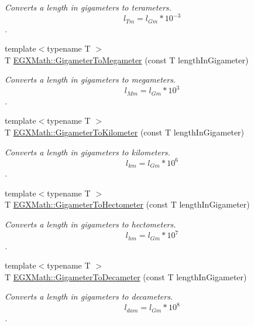 \begin{DoxyCompactItemize}
\begin{DoxyCompactList}\small\item\em Converts a length in gigameters to terameters. \[ l_{Tm}=l_{Gm} * 10^{-3} \]. \end{DoxyCompactList}\item 
{\footnotesize template$<$typename T $>$ }\\T \mbox{\hyperlink{group___e_g_x_math-_conversions-_length_conversions-_s_i-_gigameter-_s_i_ga13984c61b3aaa41953de2415c6981f37}{E\+G\+X\+Math\+::\+Gigameter\+To\+Megameter}} (const T length\+In\+Gigameter)
\begin{DoxyCompactList}\small\item\em Converts a length in gigameters to megameters. \[ l_{Mm}=l_{Gm} * 10^{3} \]. \end{DoxyCompactList}\item 
{\footnotesize template$<$typename T $>$ }\\T \mbox{\hyperlink{group___e_g_x_math-_conversions-_length_conversions-_s_i-_gigameter-_s_i_ga6f5a65da868d2c40485588dff765836e}{E\+G\+X\+Math\+::\+Gigameter\+To\+Kilometer}} (const T length\+In\+Gigameter)
\begin{DoxyCompactList}\small\item\em Converts a length in gigameters to kilometers. \[ l_{km}=l_{Gm} * 10^{6} \]. \end{DoxyCompactList}\item 
{\footnotesize template$<$typename T $>$ }\\T \mbox{\hyperlink{group___e_g_x_math-_conversions-_length_conversions-_s_i-_gigameter-_s_i_ga25121199c511ed43c20fa9c9bdefc0ca}{E\+G\+X\+Math\+::\+Gigameter\+To\+Hectometer}} (const T length\+In\+Gigameter)
\begin{DoxyCompactList}\small\item\em Converts a length in gigameters to hectometers. \[ l_{hm}=l_{Gm} * 10^{7} \]. \end{DoxyCompactList}\item 
{\footnotesize template$<$typename T $>$ }\\T \mbox{\hyperlink{group___e_g_x_math-_conversions-_length_conversions-_s_i-_gigameter-_s_i_gab0233167d63c136801ae42faabe64263}{E\+G\+X\+Math\+::\+Gigameter\+To\+Decameter}} (const T length\+In\+Gigameter)
\begin{DoxyCompactList}\small\item\em Converts a length in gigameters to decameters. \[ l_{dam}=l_{Gm} * 10^{8} \]. \end{DoxyCompactList}\item 

\end{DoxyCompactItemize}
